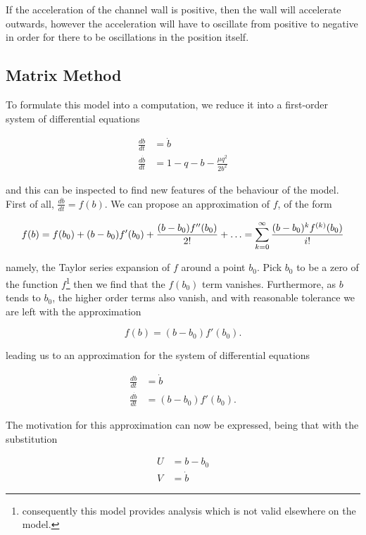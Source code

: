 \documentclass{article}
\begin{document}
If the acceleration of the channel wall is positive, then the wall will accelerate outwards,
however the acceleration will have to oscillate from positive to negative in order for there to be oscillations in the position itself.

\subsection{Matrix Method}

To formulate this model into a computation, we reduce it into a first-order system of differential equations

\begin{align}
    \frac{db}{dt} &= \dot{b} \\
    \frac{d\dot{b}}{dt} &= 1 - q - b - \frac{\mu q^2}{2b^2}
\end{align}

and this can be inspected to find new features of the behaviour of the model.
First of all, $\frac{d\dot{b}}{dt} = f(b)$.
We can propose an approximation of $f$, of the form

\begin{equation*}
    f(b) = f(b_0) + (b-b_0)f'(b_0) + \frac{(b-b_0)f''(b_0)}{2!} + \mathellipsis = \sum_{k=0}^\infty\frac{(b-b_0)^{k}f^{(k)}(b_0)}{i!}
\end{equation*}

namely, the Taylor series expansion of $f$ around a point $b_0$.
Pick $b_0$ to be a zero of the function $f$\footnote{consequently this model provides analysis which is not valid elsewhere on the model.}
then we find that the $f(b_0)$ term vanishes.
Furthermore, as $b$ tends to $b_0$, the higher order terms also vanish,
and with reasonable tolerance we are left with the approximation

\begin{equation}
    f(b) = (b-b_0)f'(b_0).
\end{equation}

leading us to an approximation for the system of differential equations

\begin{align}
    \frac{db}{dt} &= \dot{b} \\
    \frac{d\dot{b}}{dt} &= (b-b_0)f'(b_0).
\end{align}

The motivation for this approximation can now be expressed,
being that with the substitution

\begin{align}
    U &= b - b_0 \\
    V &= \dot{b}
\end{align}
\end{document}
